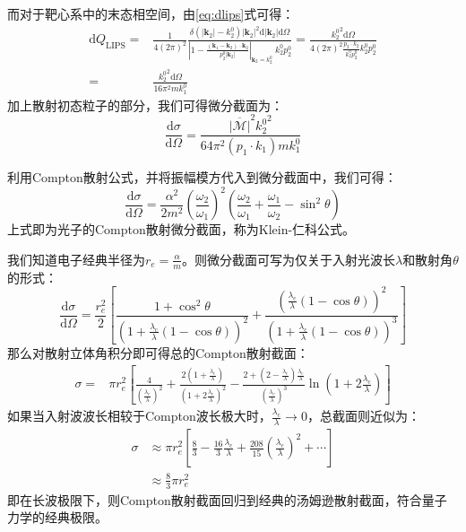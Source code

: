 而对于靶心系中的末态相空间，由\eqref{eq:dlips}式可得：
\begin{equation}
\begin{split}
\mathrm{d}Q_\text{LIPS}=&\frac{1}{4(2\pi)^2}\frac{\delta(|\boldsymbol{k}_2|-k_2^0){|\boldsymbol{k}_2|}^2\mathrm{d}|\boldsymbol{k}_2|\mathrm{d}\Omega}{\left|1-\frac{(\boldsymbol{k}_1-\boldsymbol{k}_2)\cdot\boldsymbol{k}_2}{p_2^0|\boldsymbol{k}_2|}\right|_{\boldsymbol{k}_2=k_2^0}\;k_2^0 p_2^0}=\frac{{k_2^0}^2\mathrm{d}\Omega}{4(2\pi)^2 \frac{p_2\cdot k_2}{k_2^0 p_2^0} k_2^0 p_2^0}\\
=&\frac{{k_2^0}^2\mathrm{d}\Omega}{16\pi^2mk_1^0}
\end{split}
\end{equation}
加上散射初态粒子的部分，我们可得微分截面为：
\begin{equation}
\frac{\mathrm{d}\sigma}{\mathrm{d}\Omega}=\frac{\overline{|\mathcal{M}|}^2{k_2^0}^2}{64\pi^2(p_1\cdot k_1)mk_1^0}
\end{equation}

利用Compton散射公式，并将振幅模方代入到微分截面中，我们可得：
\begin{equation}
\frac{\mathrm{d}\sigma}{\mathrm{d}\Omega}=\frac{\alpha^2}{2m^2}\left(\frac{\omega_2}{\omega_1}\right)^2\left(\frac{\omega_2}{\omega_1}+\frac{\omega_1}{\omega_2}-\sin^2\theta\right)
\end{equation}
上式即为光子的Compton散射微分截面，称为Klein-仁科公式。

我们知道电子经典半径为$r_e=\frac{\alpha}{m}$。则微分截面可写为仅关于入射光波长$\lambda$和散射角$\theta$的形式：
\begin{equation}
\frac{\mathrm{d}\sigma}{\mathrm{d}\Omega}=\frac{r_e^2}{2}\left[\frac{1+\cos^2\theta}{\left(1+\frac{\lambda_\text{c}}{\lambda}(1-\cos\theta)\right)^2}+\frac{\left(\frac{\lambda_\text{c}}{\lambda}(1-\cos\theta)\right)^2}{\left(1+\frac{\lambda_\text{c}}{\lambda}(1-\cos\theta)\right)^3}\right]
\end{equation}
那么对散射立体角积分即可得总的Compton散射截面：
\begin{equation}
\begin{split}
\sigma=&\pi r_e^2\left[\frac{4}{\left(\frac{\lambda_\text{c}}{\lambda}\right)^2}+\frac{2(1+\frac{\lambda_\text{c}}{\lambda})}{\left(1+2\frac{\lambda_\text{c}}{\lambda}\right)^2}-\frac{2+(2-\frac{\lambda_\text{c}}{\lambda})\frac{\lambda_\text{c}}{\lambda}}{\left(\frac{\lambda_\text{c}}{\lambda}\right)^3}\ln\left(1+2\frac{\lambda_\text{c}}{\lambda}\right)\right]
\end{split}
\end{equation}
如果当入射波波长相较于Compton波长极大时，$\frac{\lambda_\text{c}}{\lambda}\rightarrow0$，总截面则近似为：
\begin{equation}
\begin{split}
\sigma&\approx\pi r_e^2\left[\frac{8}{3}-\frac{16}{3}\frac{\lambda_\text{c}}{\lambda}+\frac{208}{15}\left(\frac{\lambda_\text{c}}{\lambda}\right)^2+\cdots\right]\\
&\approx\frac{8}{3}\pi r_e^2
\end{split}
\end{equation}
即在长波极限下，则Compton散射截面回归到经典的汤姆逊散射截面，符合量子力学的经典极限。

